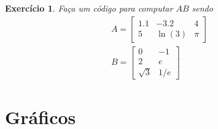 \documentclass[12pt]{article}
\newtheorem{exr}{Exercício}[section]
\begin{document}
\begin{exr}
  Faça um código para computar $AB$ sendo
  \begin{gather}
    A =
    \begin{bmatrix}
      1.1 & -3.2 & 4\\
      5 & \ln(3) & \pi
    \end{bmatrix}\\
    B =
    \begin{bmatrix}
      0 & -1\\
      2 & e \\
      \sqrt{3} & 1/e
    \end{bmatrix}
  \end{gather}
\end{exr}


\section{Gráficos}

\emconstrucao


\nocite{*}
% 

\end{document}
